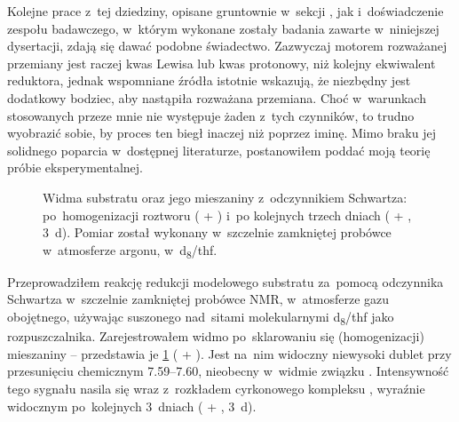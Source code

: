 Kolejne prace z~tej dziedziny, opisane gruntownie w~sekcji ,
  jak i~doświadczenie zespołu badawczego, w~którym wykonane zostały badania zawarte
  w~niniejszej dysertacji, zdają się dawać podobne świadectwo.
Zazwyczaj motorem rozważanej przemiany jest raczej kwas Lewisa lub kwas protonowy,
  niż kolejny ekwiwalent reduktora, jednak wspomniane źródła istotnie wskazują,
  że niezbędny jest dodatkowy bodziec, aby nastąpiła rozważana przemiana.
Choć w~warunkach stosowanych przeze mnie nie występuje żaden z~tych czynników, to trudno wyobrazić sobie, by proces ten biegł inaczej niż poprzez iminę.
Mimo braku jej solidnego poparcia w~dostępnej literaturze, postanowiłem poddać moją teorię
  próbie eksperymentalnej.

\begin{figure}
  
  \caption{
    Widma \NMR*{} substratu  oraz jego mieszaniny z~odczynnikiem Schwartza:
      po~homogenizacji roztworu ( + ) i~po kolejnych trzech dniach
      ( + , \SI{3}{\day}).
    Pomiar został wykonany w~szczelnie zamkniętej probówce w~atmosferze argonu,
      w~d\textsubscript{8}\-/\acrshort{thf}.
  }\label{fig:nmr-imine-trace}
\end{figure}

\begin{marginfigure}[-17.5em]
  
  \caption{
    Zbliżenie na~dublet widoczny na~\protect\cref{fig:nmr-imine-trace}, będący najpewniej
      sygnałem pochodzącym od~iminowego protonu, zaznaczonego zielonym kolorem w~strukturze
      na~\protect\cref{sch:zr-to-imine} (struktura~).
  }\label{fig:nmr-imine-expand}
\end{marginfigure}

Przeprowadziłem reakcję redukcji modelowego substratu  za~pomocą odczynnika
  Schwartza w~szczelnie zamkniętej probówce NMR, w~atmosferze gazu obojętnego, używając
  suszonego nad~sitami molekularnymi d\textsubscript{8}\-/\acrshort{thf} jako rozpuszczalnika.
Zarejestrowałem widmo \NMR*{} po~sklarowaniu się (homogenizacji) mieszaniny \--- przedstawia
  je \cref{fig:nmr-imine-trace} ( + ).
Jest na~nim widoczny niewysoki dublet przy przesunięciu chemicznym \SIrange{7.59}{7.60}{\ppm},
  nieobecny w~widmie związku .
Intensywność tego sygnału nasila się wraz z~rozkładem cyrkonowego kompleksu ,
  wyraźnie widocznym po~kolejnych 3~dniach
  ( + , \SI{3}{\day}).

